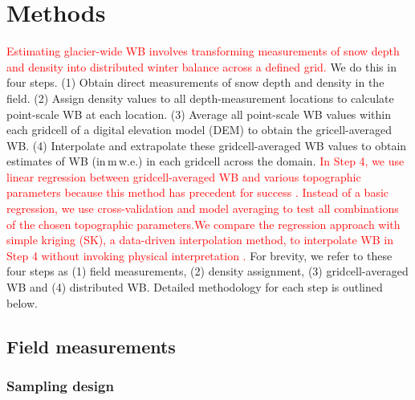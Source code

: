 \documentclass[twocolumn, letterpaper]{igs}
\begin{document}


\section{Methods}

\textcolor{red}{Estimating glacier-wide WB involves transforming measurements of snow depth and density into distributed winter balance across a defined grid.} We do this in four steps. (1) Obtain direct measurements of snow depth and density in the field. (2) Assign density values to all depth-measurement locations to calculate point-scale WB at each location. (3) Average all point-scale WB values within each gridcell of a digital elevation model (DEM) to obtain the gricell-averaged WB. (4) Interpolate and extrapolate these gridcell-averaged WB values to obtain estimates of WB (in\,m\,w.e.) in each gridcell across the domain. \textcolor{red}{In Step 4, we use linear regression between gridcell-averaged WB and various topographic parameters because this method has precedent for success \citep[e.g.][]{McGrath2015}. Instead of a basic regression, we use cross-validation and model averaging to test all combinations of the chosen topographic parameters.We compare the regression approach with simple kriging (SK), a data-driven interpolation method, to interpolate WB in Step 4 without invoking physical interpretation \citep[e.g.][]{Hock1999}.} For brevity, we refer to these four steps as (1) field measurements, (2) density assignment, (3) gridcell-averaged WB and (4) distributed WB. Detailed methodology for each step is outlined below.

\subsection{Field measurements}

\subsubsection{Sampling design}
\end{document}
